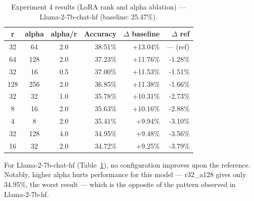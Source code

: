 \begin{table}[ht]
  \caption{Experiment 4 results (LoRA rank and alpha ablation) --- Llama-2-7b-chat-hf (baseline: 25.47\%).}
  \centering
  \footnotesize
  \begin{tabular}{cccrrr}
  \toprule
  \textbf{r} & \textbf{alpha} & \textbf{alpha/r} & \textbf{Accuracy} & \textbf{$\Delta$ baseline} & \textbf{$\Delta$ ref} \\
  \midrule
  32  & 64  & 2.0 & 38.51\% & +13.04\% & --- (ref) \\
  64  & 128 & 2.0 & 37.23\% & +11.76\% & -1.28\% \\
  32  & 16  & 0.5 & 37.00\% & +11.53\% & -1.51\% \\
  128 & 256 & 2.0 & 36.85\% & +11.38\% & -1.66\% \\
  32  & 32  & 1.0 & 35.78\% & +10.31\% & -2.73\% \\
  8   & 16  & 2.0 & 35.63\% & +10.16\% & -2.88\% \\
  4   & 8   & 2.0 & 35.41\% & +9.94\%  & -3.10\% \\
  32  & 128 & 4.0 & 34.95\% & +9.48\%  & -3.56\% \\
  16  & 32  & 2.0 & 34.72\% & +9.25\%  & -3.79\% \\
  \bottomrule
  \end{tabular}

  \label{tab:exp4-llama-chat}
  \end{table}

  For Llama-2-7b-chat-hf
  (Table~\ref{tab:exp4-llama-chat}), no configuration
  improves upon the reference. Notably, higher alpha
  hurts performance for this model --- r32\_a128 gives
  only 34.95\%, the worst result --- which is the
  opposite of the pattern observed in Llama-2-7b-hf.

